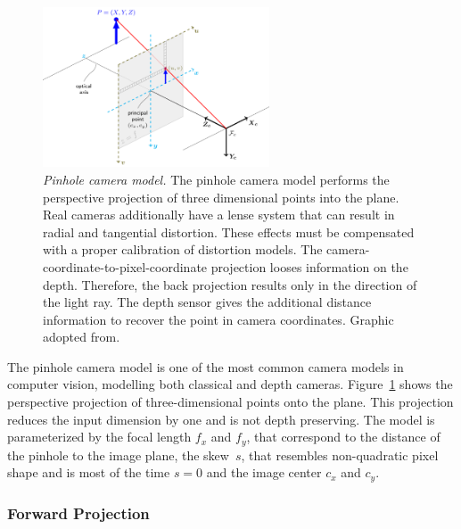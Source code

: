 \begin{figure}[H]
    \includegraphics[width=0.6\textwidth]{chapter03/img/pinhole_camera_model.png}
    \caption[Pinhole camera model]{\emph{Pinhole camera model.} The pinhole camera model performs the perspective projection of three dimensional points into the plane. Real cameras additionally have a lense system that can result in radial and tangential distortion. These effects must be compensated with a proper calibration of distortion models. The camera-coordinate-to-pixel-coordinate projection looses information on the depth. Therefore, the back projection results only in the direction of the light ray. The depth sensor gives the additional distance information to recover the point in camera coordinates. Graphic adopted from\cite{opencv_pinhole}.}\label{fig:pinhole_model}
\end{figure}
The pinhole camera model is one of the most common camera models in computer vision, modelling both classical and depth cameras.
Figure~\ref{fig:pinhole_model} shows the perspective projection of three-dimensional points onto the plane\cite[p. 25-35]{hartley_2004}.
This projection reduces the input dimension by one and is not depth preserving.
The model is parameterized by the focal length $f_x$ and $f_y$, that correspond to the distance of the pinhole to the image plane, the skew~$s$, that resembles non-quadratic pixel shape and is most of the time $s = 0$ and the image center $c_x$ and $c_y$.

\subsubsection*{Forward Projection}

